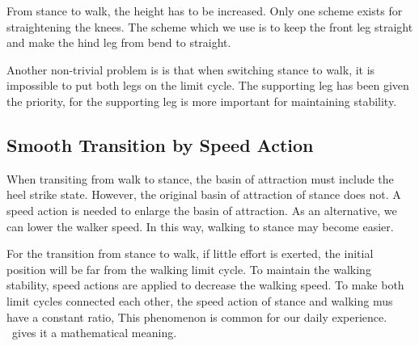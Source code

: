 From stance to walk, the height has to be increased.
Only one scheme exists for straightening the knees.
The scheme which we use is to keep the front leg straight and make the hind leg from bend to straight.


Another non-trivial problem is is that when switching stance to walk, it is impossible to put both legs on the limit cycle.
The supporting leg has been given the priority, for the supporting leg is more important for maintaining stability.





\subsection{Smooth Transition by  Speed Action}
When transiting from walk to stance, the basin of attraction must include the heel strike state.
However, the original basin of attraction of stance does not. 
A speed action is needed to enlarge the basin of attraction.
As an alternative, we can lower the walker speed. 
In this way, walking to stance may become easier.

For the transition from stance to walk, if little effort is exerted, the initial position will be far from the walking limit cycle.
To maintain the walking stability, speed actions are applied to decrease the walking speed.
To make both limit cycles connected each other, the speed action of stance and walking mus have a constant ratio,
This phenomenon is common for our daily experience.
\moit\ gives it a mathematical meaning.

























